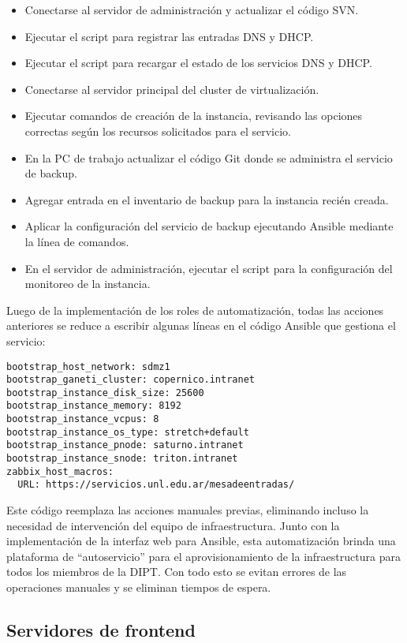 \begin{itemize}
\item Conectarse al servidor de administración y actualizar el código SVN.
\item Ejecutar el script para registrar las entradas DNS y DHCP.
\item Ejecutar el script para recargar el estado de los servicios DNS y DHCP.
\item Conectarse al servidor principal del cluster de virtualización.
\item Ejecutar comandos de creación de la instancia, revisando las opciones correctas según los recursos solicitados para el servicio.
\item En la PC de trabajo actualizar el código Git donde se administra el servicio de backup.
\item Agregar entrada en el inventario de backup para la instancia recién creada.
\item Aplicar la configuración del servicio de backup ejecutando Ansible mediante la línea de comandos.
\item En el servidor de administración, ejecutar el script para la configuración del monitoreo de la instancia.
\end{itemize}
Luego de la implementación de los roles de automatización, todas las acciones anteriores se reduce a escribir algunas líneas en el código Ansible que gestiona el servicio:

\begin{verbatim}
bootstrap_host_network: sdmz1
bootstrap_ganeti_cluster: copernico.intranet
bootstrap_instance_disk_size: 25600
bootstrap_instance_memory: 8192
bootstrap_instance_vcpus: 8
bootstrap_instance_os_type: stretch+default
bootstrap_instance_pnode: saturno.intranet
bootstrap_instance_snode: triton.intranet
zabbix_host_macros:
  URL: https://servicios.unl.edu.ar/mesadeentradas/
\end{verbatim}

Este código reemplaza las acciones manuales previas, eliminando incluso la necesidad de intervención del equipo de infraestructura. Junto con la implementación de la interfaz web para Ansible, esta automatización brinda una plataforma de “autoservicio” para el aprovisionamiento de la infraestructura para todos los miembros de la DIPT. Con todo esto se evitan errores de las operaciones manuales y se eliminan tiempos de espera.

\subsection{Servidores de frontend}

